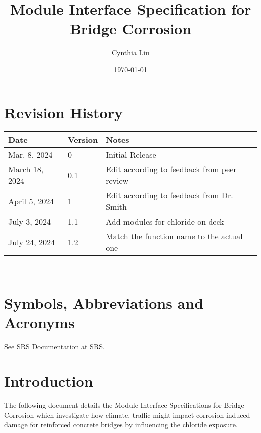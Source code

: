 \documentclass[12pt, titlepage]{article}
\begin{document}
\title{Module Interface Specification for Bridge Corrosion}

\author{Cynthia Liu}

\date{\today}

\maketitle


\section{Revision History}

\begin{tabularx}{\textwidth}{p{3cm}p{2cm}X}
\toprule {\bf Date} & {\bf Version} & {\bf Notes}\\
\midrule
Mar. 8, 2024 & 0 & Initial Release\\
March 18, 2024 & 0.1 & Edit according to feedback from peer review \\
April 5, 2024 & 1 & Edit according to feedback from Dr. Smith\\
July 3, 2024 & 1.1 & Add modules for chloride on deck\\
July 24, 2024 & 1.2 & Match the function name to the actual one \\
\bottomrule
\end{tabularx}

~\newpage

\section{Symbols, Abbreviations and Acronyms}

See SRS Documentation at \href{https://github.com/CynthiaLiu0805/BridgeCorrosion/blob/main/docs/SRS/SRS.pdf}{SRS}.


\newpage

\tableofcontents

\newpage


\section{Introduction}

The following document details the Module Interface Specifications for Bridge Corrosion which investigate how climate, traffic might impact corrosion-induced
damage for reinforced concrete bridges by influencing the chloride exposure.
\end{document}
